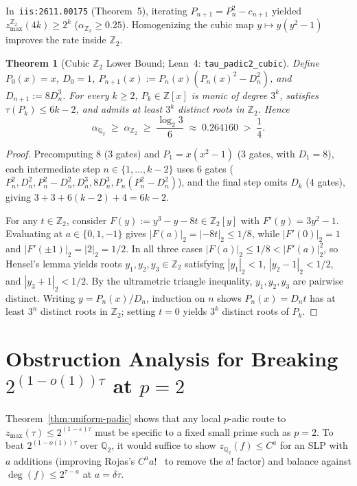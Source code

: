 \documentclass[11pt]{article}
\newtheorem{theorem}{Theorem}[section]
\newcommand{\Z}{\mathbb{Z}}
\newcommand{\Q}{\mathbb{Q}}
\newcommand{\code}[1]{\texttt{#1}}
\newcommand{\zmax}{z_{\max}}
\begin{document}
In~\code{iis:2611.00175} (Theorem~5), iterating $P_{n+1} = P_n^2 - c_{n+1}$ yielded $\zmax^{\Z_2}(4k) \ge 2^k$ ($\alpha_{\Z_2} \ge 0.25$). Homogenizing the cubic map $y \mapsto y(y^2 - 1)$ improves the rate inside $\Z_2$.

\begin{theorem}[Cubic $\Z_2$ Lower Bound; Lean~4: \code{tau\_padic2\_cubic}]
\label{thm:cubic-z2}
Define $P_0(x) = x$, $D_0 = 1$, $P_{n+1}(x) := P_n(x)(P_n(x)^2 - D_n^2)$, and $D_{n+1} := 8 D_n^3$. For every $k \ge 2$, $P_k \in \Z[x]$ is monic of degree $3^k$, satisfies $\tau(P_k) \le 6k - 2$, and admits at least $3^k$ distinct roots in $\Z_2$. Hence
\[
  \alpha_{\Q_2} \;\ge\; \alpha_{\Z_2} \;\ge\; \frac{\log_2 3}{6} \;\approx\; 0.264160 \;>\; \frac{1}{4}.
\]
\end{theorem}

\begin{proof}
Precomputing $8$ ($3$ gates) and $P_1 = x(x^2 - 1)$ ($3$ gates, with $D_1 = 8$), each intermediate step $n \in \{1, \dots, k-2\}$ uses $6$ gates ($P_n^2, D_n^2, P_n^2 - D_n^2, D_n^3, 8 D_n^3, P_n(P_n^2 - D_n^2)$), and the final step omits $D_k$ ($4$ gates), giving $3 + 3 + 6(k-2) + 4 = 6k - 2$.

For any $t \in \Z_2$, consider $F(y) := y^3 - y - 8t \in \Z_2[y]$ with $F'(y) = 3y^2 - 1$. Evaluating at $a \in \{0, 1, -1\}$ gives $|F(a)|_2 = |-8t|_2 \le 1/8$, while $|F'(0)|_2 = 1$ and $|F'(\pm 1)|_2 = |2|_2 = 1/2$. In all three cases $|F(a)|_2 \le 1/8 < |F'(a)|_2^2$, so Hensel's lemma yields roots $y_1, y_2, y_3 \in \Z_2$ satisfying $|y_1|_2 < 1$, $|y_2 - 1|_2 < 1/2$, and $|y_3 + 1|_2 < 1/2$. By the ultrametric triangle inequality, $y_1, y_2, y_3$ are pairwise distinct. Writing $y = P_n(x)/D_n$, induction on $n$ shows $P_n(x) = D_n t$ has at least $3^n$ distinct roots in $\Z_2$; setting $t = 0$ yields $3^k$ distinct roots of $P_k$.
\end{proof}

\section{Obstruction Analysis for Breaking $2^{(1-o(1))\tau}$ at $p = 2$}

Theorem~\ref{thm:uniform-padic} shows that any local $p$-adic route to $\zmax(\tau) \le 2^{(1-\varepsilon)\tau}$ must be specific to a fixed small prime such as $p = 2$. To beat $2^{(1-o(1))\tau}$ over $\Q_2$, it would suffice to show $z_{\Q_2}(f) \le C^a$ for an SLP with $a$ additions (improving Rojas's $C^a a!$~\cite{Rojas2002,Rojas2003} to remove the $a!$ factor) and balance against $\deg(f) \le 2^{\tau - a}$ at $a = \delta \tau$.
\end{document}
